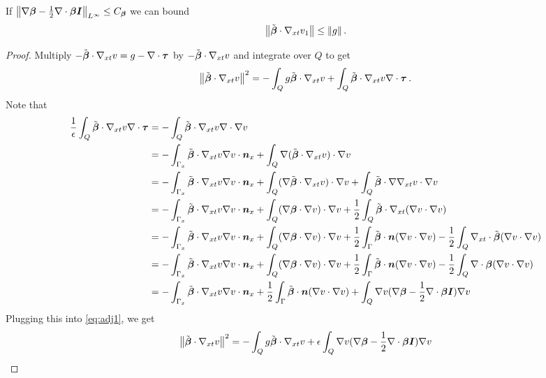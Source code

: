 \documentclass{article}
\begin{document}
\begin{lemma}
\label{lem:convective}
If 
$
\left\| \nabla\boldsymbol\beta-\frac{1}{2}\nabla\cdot\boldsymbol\beta\boldsymbol I \right\|_{L^{\infty}}\le C_{\boldsymbol\beta}
$
we can bound
\[
\left\| \tilde{\boldsymbol\beta}\cdot\nabla_{xt} v_1 \right\|\leq \left\| g \right\|.
\]
\end{lemma}
\begin{proof}
Multiply $-\tilde{\boldsymbol\beta}\cdot\nabla_{xt} v=g-\nabla\cdot\boldsymbol\tau$ by $-\tilde{\boldsymbol\beta}\cdot\nabla_{xt} v$ and integrate over $Q$ to get
\begin{equation}
\label{eq:adj1}
\left\| \tilde{\boldsymbol\beta}\cdot\nabla_{xt} v \right\|^2=-\int_Q g\tilde{\boldsymbol\beta}\cdot\nabla_{xt} v+\int_Q\tilde{\boldsymbol\beta}\cdot\nabla_{xt} v\nabla\cdot\boldsymbol\tau\,.
\end{equation}
Note that
\begin{align*}
\frac{1}{\epsilon}\int_Q\tilde\bfbeta\cdot\Gradxt v\Div\bftau&=-\int_Q\tilde\bfbeta\cdot\Gradxt v\Div\Grad v \\
%
&=-\int_{\Gamma_x}\tilde\bfbeta\cdot\Gradxt v\Grad v\cdot\bfn_x
+\int_Q\Grad(\tilde\bfbeta\cdot\Gradxt v)\cdot\Grad v \\
%
&=-\int_{\Gamma_x}\tilde\bfbeta\cdot\Gradxt v\Grad v\cdot\bfn_x
+\int_Q(\Grad\tilde\bfbeta\cdot\Gradxt v)\cdot\Grad v
+\int_Q\tilde\bfbeta\cdot\Grad\Gradxt v\cdot\Grad v\\
%
&=-\int_{\Gamma_x}\tilde\bfbeta\cdot\Gradxt v\Grad v\cdot\bfn_x
+\int_Q(\Grad\bfbeta\cdot\Grad v)\cdot\Grad v
+\frac{1}{2}\int_Q\tilde\bfbeta\cdot\Gradxt(\Grad v\cdot\Grad v)\\
%
&=-\int_{\Gamma_x}\tilde\bfbeta\cdot\Gradxt v\Grad v\cdot\bfn_x
+\int_Q(\Grad\bfbeta\cdot\Grad v)\cdot\Grad v
+\frac{1}{2}\int_\Gamma\tilde\bfbeta\cdot\bfn(\Grad v\cdot\Grad v)
-\frac{1}{2}\int_Q\Divxt\tilde\bfbeta(\Grad v\cdot\Grad v)\\
%
&=-\int_{\Gamma_x}\tilde\bfbeta\cdot\Gradxt v\Grad v\cdot\bfn_x
+\int_Q(\Grad\bfbeta\cdot\Grad v)\cdot\Grad v
+\frac{1}{2}\int_\Gamma\tilde\bfbeta\cdot\bfn(\Grad v\cdot\Grad v)
-\frac{1}{2}\int_Q\Div\bfbeta(\Grad v\cdot\Grad v)\\
%
&=-\int_{\Gamma_x}\tilde\bfbeta\cdot\Gradxt v\Grad v\cdot\bfn_x
+\frac{1}{2}\int_\Gamma\tilde\bfbeta\cdot\bfn(\Grad v\cdot\Grad v)
+\int_Q\Grad v(\Grad\bfbeta-\frac{1}{2}\Div\bfbeta\bfI)\Grad v\\
\end{align*}
Plugging this into \eqref{eq:adj1}, we get
\begin{align*}
\norm{\tilde\bfbeta\cdot\Gradxt v}^2
&=-\int_Q g\tilde\bfbeta\cdot\Gradxt v
+\epsilon\int_Q\Grad v(\Grad\bfbeta-\frac{1}{2}\Div\bfbeta\bfI)\Grad v\\

\end{align*}
\end{proof}
\end{document}
